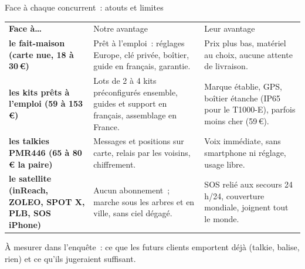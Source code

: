 \begin{frame}{Face à chaque concurrent~: atouts et limites}
  \footnotesize\renewcommand{\arraystretch}{1.25}\setlength{\tabcolsep}{4pt}
   
  \noindent\begin{tabularx}{\textwidth}{@{}>{\raggedright\arraybackslash\bfseries}p{2.9cm}>{\raggedright\arraybackslash}X>{\raggedright\arraybackslash}X@{}}
    \rowcolor{insarose}\textcolor{insarouge}{Face à…} & \textcolor{insarouge}{Notre avantage} & \textcolor{insarouge}{Leur avantage}\\
    le fait-maison (carte nue, 18 à 30\,€) & Prêt à l'emploi~: réglages Europe, clé privée, boîtier, guide en français, garantie. & Prix plus bas, matériel au choix, aucune attente de livraison.\\
    \arrayrulecolor{insagris!30}\hline
    les kits prêts à l'emploi (59 à 153\,€) & Lots de 2 à 4 kits préconfigurés ensemble, guides et support en français, assemblage en France. & Marque établie, GPS, boîtier étanche (IP65 pour le T1000-E), parfois moins cher (59\,€).\\
    \hline
    les talkies PMR446 (65 à 80\,€ la paire) & Messages et positions sur carte, relais par les voisins, chiffrement. & Voix immédiate, sans smartphone ni réglage, usage libre.\\
    \hline
    le satellite (inReach, ZOLEO, SPOT X, PLB, SOS iPhone) & Aucun abonnement~; marche sous les arbres et en ville, sans ciel dégagé. & SOS relié aux secours 24\,h/24, couverture mondiale, joignent tout le monde.\\
  \end{tabularx}
  \vspace{0.15cm}
  \begin{pcompact}\centering\footnotesize
    À mesurer dans l'enquête~: ce que les futurs clients emportent déjà (talkie, balise, rien) et ce qu'ils jugeraient suffisant.
  \end{pcompact}
\end{frame}
